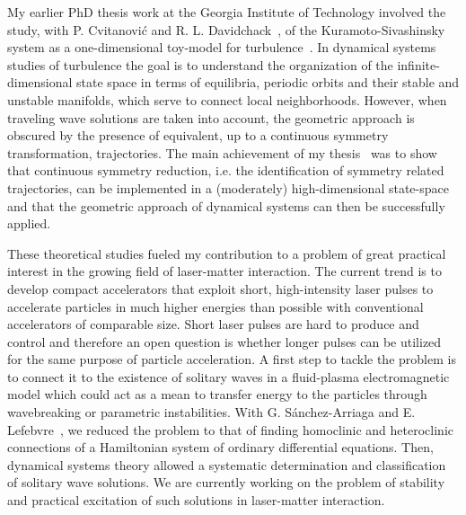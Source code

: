 \documentclass[a4paper,10pt]{article}
\begin{document}
My earlier PhD thesis work at the Georgia Institute of Technology
involved the study, with P. Cvitanovi\'c and R. L. Davidchack~\cite{SCD07}, 
of the Kuramoto-Sivashinsky system
as a one-dimensional 
toy-model for turbulence~\cite{SCD07}. 
In dynamical systems studies of turbulence the goal is to understand
the organization of the infinite-dimensional state space 
in terms of equilibria, periodic orbits and their
stable and unstable manifolds, which serve to connect local neighborhoods.
However, when traveling wave solutions are taken into account, the geometric
approach is obscured by the presence of equivalent, up to a continuous symmetry
transformation, trajectories. The main achievement of my
thesis~\cite{SiminosThesis,SiCvi10} was to show that continuous symmetry
reduction, i.e. the identification of symmetry related trajectories, can be
implemented in a (moderately) high-dimensional state-space and that the
geometric approach of dynamical systems can then be successfully applied.

These theoretical studies fueled my contribution to a problem of great
practical interest in the growing field of laser-matter interaction. 
The current trend is to develop compact accelerators that
exploit short, high-intensity laser pulses to accelerate particles
in much higher energies than possible with conventional accelerators 
of comparable size. Short laser pulses are hard to produce and control and
therefore an open question is whether longer pulses can be utilized for
the same purpose of particle acceleration. A first step to tackle the
problem is to connect it to the existence of solitary waves 
in a fluid-plasma electromagnetic model which could act as a mean to transfer   
energy to the particles through wavebreaking or parametric instabilities.
With G. S\'anchez-Arriaga and E. Lefebvre~\cite{SSL10}, we reduced
the problem to that of finding homoclinic and heteroclinic connections
of a Hamiltonian system of ordinary differential equations. Then,
dynamical systems theory allowed a systematic determination and classification
of solitary wave solutions. We are currently working on the problem
of stability and practical excitation of such solutions in laser-matter
interaction.
\end{document}
